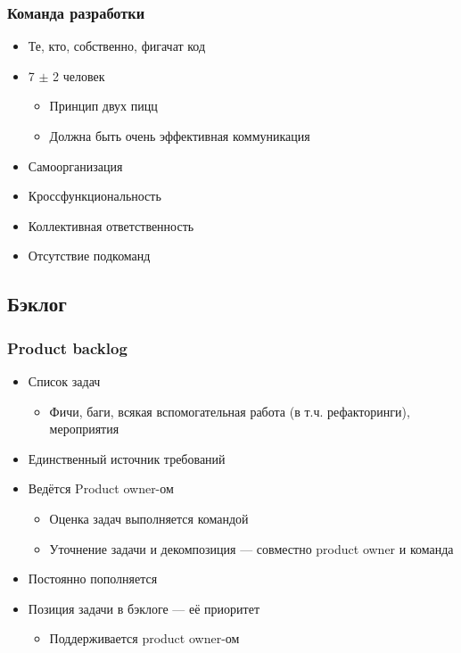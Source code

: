 \documentclass{../../slides-style}
\begin{document}
    \begin{frame}
        \frametitle{Команда разработки}
        \begin{itemize}
            \item Те, кто, собственно, фигачат код
            \item 7 $\pm$ 2 человек
            \begin{itemize}
                \item Принцип двух пицц
                \item Должна быть очень эффективная коммуникация
            \end{itemize}
            \item Самоорганизация
            \item Кроссфункциональность
            \item Коллективная ответственность
            \item Отсутствие подкоманд
        \end{itemize}
    \end{frame}

    \subsection{Бэклог}

    \begin{frame}
        \frametitle{Product backlog}
        \begin{itemize}
            \item Список задач
            \begin{itemize}
                \item Фичи, баги, всякая вспомогательная работа (в т.ч. рефакторинги), мероприятия
            \end{itemize}
            \item Единственный источник требований
            \item Ведётся Product owner-ом
            \begin{itemize}
                \item Оценка задач выполняется командой
                \item Уточнение задачи и декомпозиция --- совместно product owner и команда
            \end{itemize}
            \item Постоянно пополняется
            \item Позиция задачи в бэклоге --- её приоритет
            \begin{itemize}
                \item Поддерживается product owner-ом
            \end{itemize}
        \end{itemize}
    \end{frame}
\end{document}
